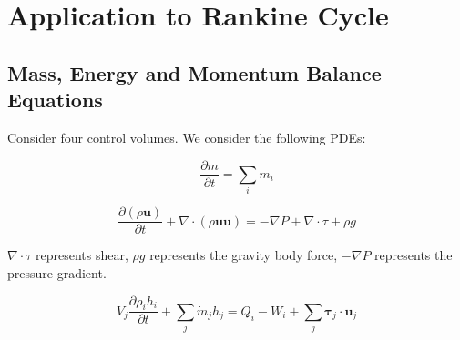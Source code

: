 \documentclass[masters]{ucbthesis}
\renewcommand{\_}{\kern-1.5pt\textunderscore\kern-1.5pt}
\begin{document}
\section{Application to Rankine Cycle}


\subsection{Mass, Energy and Momentum Balance Equations}
Consider four control volumes. We consider the following PDEs:


\begin{equation}
	\frac{\partial m}{\partial t} = \sum_i m_i
\end{equation}


\begin{equation}
	\frac{\partial (\rho \textbf{u})}{\partial t} 
	+ \nabla \cdot (\rho \textbf{u} \textbf{u})
	= - \nabla P
	+ \nabla \cdot \tau 
	+ \rho g
\end{equation}

$\nabla \cdot \tau$ represents shear, $\rho g$ represents the gravity 
body force, $- \nabla P$ represents the pressure gradient.

\begin{equation}
	V_j \frac{\partial \rho_i h_i}{\partial t} + \sum_j \dot{m}_j h_j
	= Q_i - W_i 
	+ \sum_j \mathbf{\tau}_j \cdot \mathbf{u}_j
\end{equation}
\end{document}
